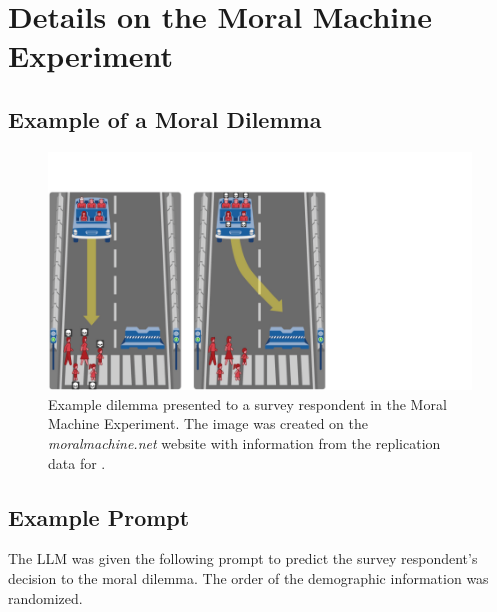\section{Details on the Moral Machine Experiment}\label{sec:appendix-moral-machine}


\subsection{Example of a Moral Dilemma}


\begin{figure}[H]
    \centering
    \includegraphics[width=0.85\linewidth]{EH3SfatQP3hygSpzF.pdf}
    \caption{Example dilemma presented to a survey respondent in the Moral Machine Experiment. The image was created on the \textit{moralmachine.net} website with information from the replication data for \citet{awad_moral_2018}.}
    \label{fig:moral-dilemma}
\end{figure}

\newpage

\subsection{Example Prompt}

The LLM was given the following prompt to predict the survey respondent's decision to the moral dilemma. The order of the demographic information was randomized.


